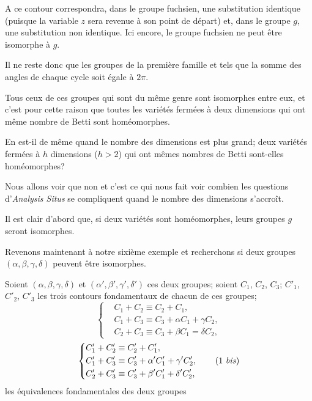 \documentclass{article}
\begin{document}
A ce contour correspondra, dans le groupe fuchsien, une substitution identique (puisque la variable $z$ sera revenue à son point de départ) et, dans le groupe $g$, une substitution non identique. Ici encore, le groupe fuchsien ne peut être isomorphe à $g$.

Il ne reste donc que les groupes de la première famille et tels que la somme des angles de chaque cycle soit égale à $2\pi$.

Tous ceux de ces groupes qui sont du même genre sont isomorphes entre eux, et c'est pour cette raison que toutes les variétés fermées à deux dimensions qui ont même nombre de Betti sont homéomorphes.

En est-il de même quand le nombre des dimensions est plus grand; deux variétés fermées à $h$ dimensions ($h > 2$) qui ont mêmes nombres de Betti sont-elles homéomorphes?

Nous allons voir que non et c'est ce qui nous fait voir combien les questions d'\emph{Analysis Situs} se compliquent quand le nombre des dimensions s'accroît.

Il est clair d'abord que, si deux variétés sont homéomorphes, leurs groupes $g$ seront isomorphes.

Revenons maintenant à notre sixième exemple et recherchons si deux groupes $(\alpha, \beta, \gamma, \delta)$ peuvent être isomorphes.

Soient $(\alpha, \beta, \gamma, \delta)$ et $(\alpha', \beta', \gamma', \delta')$ ces deux groupes; soient $C_{1}$, $C_{2}$, $C_{3}$; $C'_{1}$, $C'_{2}$, $C'_{3}$ les trois contours fondamentaux de chacun de ces groupes;
\[ \left\{ \begin{aligned} &C_{1} + C_{2} \equiv C_{2} + C_{1},\\ &C_{1} + C_{3} \equiv C_{3} + \alpha C_{1} + \gamma C_{2},\\ &C_{2} + C_{3} \equiv C_{3} + \beta C_{1} = \delta C_{2}, \end{aligned} \right. \tag{1} \]
\[ \left\{ \begin{aligned} &C'_{1} + C'_{2} \equiv C'_{2} + C'_{1},\\ &C'_{1} + C'_{3} \equiv C'_{3} + \alpha' C'_{1} + \gamma' C'_{2},\\ &C'_{2} + C'_{3} \equiv C'_{3} + \beta' C'_{1} + \delta' C'_{2}, \end{aligned} \right. \tag{1 \textit{bis}} \]
les équivalences fondamentales des deux groupes
\end{document}
